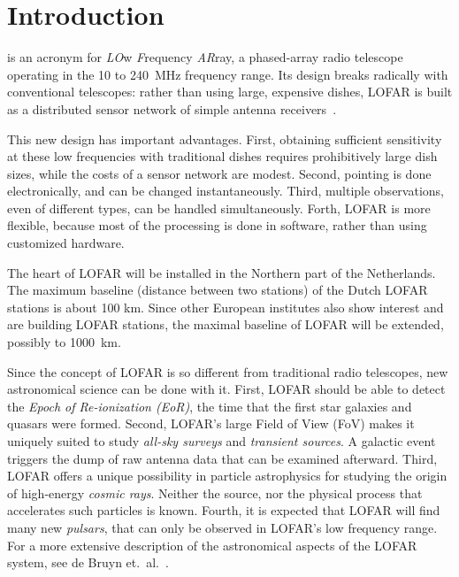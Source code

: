 \documentclass[journal]{IEEEtran}
\begin{document}
\section{Introduction}
% 
% 
% 
% 

 is an acronym for {\em LO\/}w {\em F\/}requency
{\em AR\/}ray, a phased-array radio telescope operating in the 10 to
240~MHz frequency range.
Its design breaks radically with conventional telescopes:
rather than using large, expensive dishes, LOFAR is built as a distributed
sensor network of simple antenna receivers~\cite{Butcher:04}.

This new design has important advantages.
First, obtaining sufficient sensitivity at these low frequencies with
traditional dishes requires prohibitively large dish sizes, while the costs
of a sensor network are modest.
Second, pointing is done electronically, and can be changed instantaneously.
Third, multiple observations, even of different types, can be handled
simultaneously.
Forth, LOFAR is more flexible, because most of the processing is done in
software, rather than using customized hardware.

The heart of LOFAR will be installed in the Northern part of the Netherlands.
The maximum baseline (distance between two stations) of the Dutch LOFAR
stations is about 100 km.
Since other European institutes also show interest and are building LOFAR
stations, the maximal baseline of LOFAR will be extended, possibly to 1000~km.  

Since the concept of LOFAR is so different from traditional radio telescopes,
new astronomical science can be done with it.
First, LOFAR should be able to detect the {\em Epoch of Re-ionization (EoR)},
the time that the first star galaxies and quasars were formed.
Second, LOFAR's large Field of View (FoV) makes it uniquely suited to study
{\em all-sky surveys\/} and {\em transient sources}.
A galactic event triggers the dump of raw antenna data that can be examined
afterward.
Third, LOFAR offers a unique possibility in particle astrophysics for
studying the origin of high-energy {\em cosmic rays}.
Neither the source, nor the physical process that accelerates such particles
is known.
Fourth, it is expected that LOFAR will find many new {\em pulsars}, that can
only be observed in LOFAR's low frequency range.
For a more extensive description of the astronomical aspects of the LOFAR
system, see de Bruyn et.~al.~\cite{Bruyn:02}.
\end{document}
